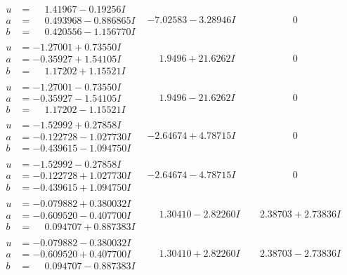 \documentclass[1p]{elsarticle_modified}
\theoremstyle{definition}
\begin{document}
$$\begin{array}{c|c|c}
\begin{aligned}
u &= \phantom{-}1.41967 - 0.19256 I \\
a &= \phantom{-}0.493968 - 0.886865 I \\
b &= \phantom{-}0.420556 - 1.156770 I\end{aligned}
 & -7.02583 - 3.28946 I & \phantom{-0.000000 } 0 \\ \hline\begin{aligned}
u &= -1.27001 + 0.73550 I \\
a &= -0.35927 + 1.54105 I \\
b &= \phantom{-}1.17202 + 1.15521 I\end{aligned}
 & \phantom{-}1.9496 + 21.6262 I & \phantom{-0.000000 } 0 \\ \hline\begin{aligned}
u &= -1.27001 - 0.73550 I \\
a &= -0.35927 - 1.54105 I \\
b &= \phantom{-}1.17202 - 1.15521 I\end{aligned}
 & \phantom{-}1.9496 - 21.6262 I & \phantom{-0.000000 } 0 \\ \hline\begin{aligned}
u &= -1.52992 + 0.27858 I \\
a &= -0.122728 - 1.027730 I \\
b &= -0.439615 - 1.094750 I\end{aligned}
 & -2.64674 + 4.78715 I & \phantom{-0.000000 } 0 \\ \hline\begin{aligned}
u &= -1.52992 - 0.27858 I \\
a &= -0.122728 + 1.027730 I \\
b &= -0.439615 + 1.094750 I\end{aligned}
 & -2.64674 - 4.78715 I & \phantom{-0.000000 } 0 \\ \hline\begin{aligned}
u &= -0.079882 + 0.380032 I \\
a &= -0.609520 - 0.407700 I \\
b &= \phantom{-}0.094707 + 0.887383 I\end{aligned}
 & \phantom{-}1.30410 - 2.82260 I & \phantom{-}2.38703 + 2.73836 I \\ \hline\begin{aligned}
u &= -0.079882 - 0.380032 I \\
a &= -0.609520 + 0.407700 I \\
b &= \phantom{-}0.094707 - 0.887383 I\end{aligned}
 & \phantom{-}1.30410 + 2.82260 I & \phantom{-}2.38703 - 2.73836 I\\

\end{array}$$
\end{document}
